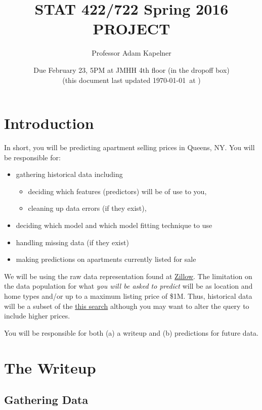 \documentclass[12pt]{article}
\title{STAT 422/722 Spring 2016 PROJECT}
\author{Professor Adam Kapelner}
\date{Due February 23, 5PM at JMHH 4th floor (in the dropoff box)\\ \vspace{0.5cm} \footnotesize (this document last updated \today ~at \currenttime)}
\begin{document}
\maketitle

\section{Introduction}


In short, you will be predicting apartment selling prices in Queens, NY. You will be responsible for:

\begin{itemize}
\item gathering historical data including
\begin{itemize}
\item deciding which features (predictors) will be of use to you,
\item cleaning up data errors (if they exist),
\end{itemize}
\item deciding which model and which model fitting technique to use
\item handling missing data (if they exist)
\item making predictions on apartments currently listed for sale
\end{itemize}

We will be using the raw data representation found at \href{http://zillow.com}{Zillow}. The limitation on the data population for what \emph{you will be asked to predict} will be  as location and home types  and/or  up to a maximum listing price of \$1M. Thus, historical data will be a subset of the \href{http://www.zillow.com/homes/recently_sold/Queens-New-York-NY/condo,apartment_duplex_type/270915_rid/0-999958_price/0-3790_mp/globalrelevanceex_sort/40.891456,-73.526344,40.453479,-74.264488_rect/10_zm/}{this search} although you may want to alter the query to include higher prices.

You will be responsible for both (a) a writeup and (b) predictions for future data.

\section{The Writeup}

\subsection{Gathering Data}
\end{document}
